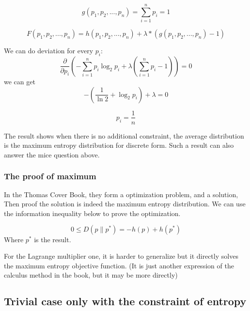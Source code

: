 \documentclass[12pt, a4paper]{article}
\begin{document}
\begin{equation}
	g(p_1,p_2,...,p_n)=\sum_{i=1}^{n}p_i=1
\end{equation}

\begin{equation}
F(p_1,p_2,...,p_n)=h(p_1,p_2,...,p_n)+\lambda *(g(p_1,p_2,...,p_n)-1) 
\end{equation}

We can do deviation for every $p_i$:
\begin{equation}
	\frac{\partial}{\partial p_{i}}\left(-\sum_{i=1}^{n} p_{i} \log _{2} p_{i}+\lambda\left(\sum_{i=1}^{n} p_{i}-1\right)\right)=0
	\end{equation}
we can get
\begin{equation}
	-\left(\frac{1}{\ln 2}+\log _{2} p_{i}\right)+\lambda=0
	\end{equation}


\begin{equation}
	p_{i}=\frac{1}{n}
\end{equation}

The result shows when there is no additional constraint, the average distribution is the maximum entropy distribution for discrete form. Such a result can also answer the mice question above.



\subsubsection{The proof of maximum}
In the Thomas Cover Book, they form a optimization problem, and a solution, Then proof the solution is indeed the maximum entropy distribution. We can use the information inequality below to prove the optimization.

\begin{equation}
	0 \leq D\left(p \| p^{*}\right)=-h(p)+h\left(p^{*}\right)
\end{equation}
Where $p^{*}$ is the result.

For the Lagrange multiplier one, it is harder to generalize but it directly solves the maximum entropy objective function. (It is just another expression of the calculus method in the book, but it may be more directly)




\subsection{Trivial case only with the constraint of entropy}
\end{document}
